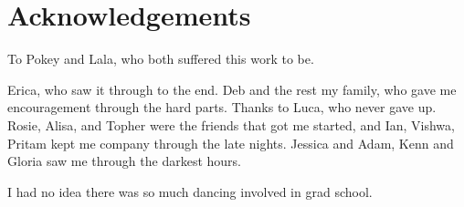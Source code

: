 \chapter{Acknowledgements}

To Pokey and Lala,
who both suffered this work to be.

Erica, who saw it through to the end.
Deb and the rest my family, who gave me encouragement through the hard parts.
Thanks to Luca, who never gave up.
Rosie, Alisa, and Topher were the friends that got me started,
and Ian, Vishwa, Pritam kept me company through the late nights.
Jessica and Adam, Kenn and Gloria saw me through the darkest hours.

I had no idea there was so much dancing involved in grad school.

